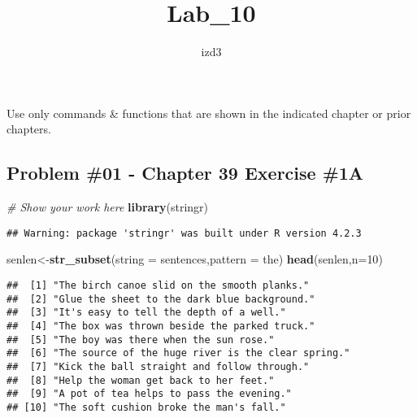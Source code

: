 \documentclass[
]{article}
\title{Lab\_10}
\author{izd3}
\date{}
\newenvironment{Shaded}{\begin{snugshade}}{\end{snugshade}}
\newcommand{\AttributeTok}[1]{\textcolor[rgb]{0.13,0.29,0.53}{#1}}
\newcommand{\CommentTok}[1]{\textcolor[rgb]{0.56,0.35,0.01}{\textit{#1}}}
\newcommand{\DecValTok}[1]{\textcolor[rgb]{0.00,0.00,0.81}{#1}}
\newcommand{\FunctionTok}[1]{\textcolor[rgb]{0.13,0.29,0.53}{\textbf{#1}}}
\newcommand{\NormalTok}[1]{#1}
\newcommand{\OtherTok}[1]{\textcolor[rgb]{0.56,0.35,0.01}{#1}}
\newcommand{\StringTok}[1]{\textcolor[rgb]{0.31,0.60,0.02}{#1}}
\begin{document}
\maketitle

Use only commands \& functions that are shown in the indicated chapter
or prior chapters.

\newpage

\hypertarget{problem-01---chapter-39-exercise-1a}{%
\subsection{Problem \#01 - Chapter 39 Exercise
\#1A}\label{problem-01---chapter-39-exercise-1a}}

\begin{Shaded}
\begin{Highlighting}[]
\CommentTok{\# Show your work here}
\FunctionTok{library}\NormalTok{(stringr)}
\end{Highlighting}
\end{Shaded}

\begin{verbatim}
## Warning: package 'stringr' was built under R version 4.2.3
\end{verbatim}

\begin{Shaded}
\begin{Highlighting}[]
\NormalTok{senlen}\OtherTok{\textless{}{-}}\FunctionTok{str\_subset}\NormalTok{(}\AttributeTok{string =}\NormalTok{ sentences,}\AttributeTok{pattern =} \StringTok{\textquotesingle{}the\textquotesingle{}}\NormalTok{)}
\FunctionTok{head}\NormalTok{(senlen,}\AttributeTok{n=}\DecValTok{10}\NormalTok{)}
\end{Highlighting}
\end{Shaded}

\begin{verbatim}
##  [1] "The birch canoe slid on the smooth planks."       
##  [2] "Glue the sheet to the dark blue background."      
##  [3] "It's easy to tell the depth of a well."           
##  [4] "The box was thrown beside the parked truck."      
##  [5] "The boy was there when the sun rose."             
##  [6] "The source of the huge river is the clear spring."
##  [7] "Kick the ball straight and follow through."       
##  [8] "Help the woman get back to her feet."             
##  [9] "A pot of tea helps to pass the evening."          
## [10] "The soft cushion broke the man's fall."
\end{verbatim}
\end{document}
